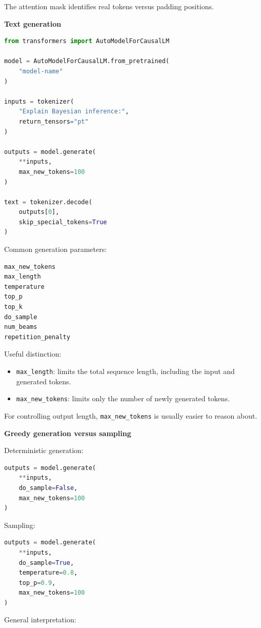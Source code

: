 \documentclass[11pt,letterpaper]{article}
\begin{document}
The attention mask identifies real tokens versus padding positions.

\textbf{Text generation}

\begin{lstlisting}[language=Python]
from transformers import AutoModelForCausalLM

model = AutoModelForCausalLM.from_pretrained(
    "model-name"
)

inputs = tokenizer(
    "Explain Bayesian inference:",
    return_tensors="pt"
)

outputs = model.generate(
    **inputs,
    max_new_tokens=100
)

text = tokenizer.decode(
    outputs[0],
    skip_special_tokens=True
)
\end{lstlisting}

Common generation parameters:

\begin{lstlisting}
max_new_tokens
max_length
temperature
top_p
top_k
do_sample
num_beams
repetition_penalty
\end{lstlisting}

Useful distinction:

\begin{itemize}[leftmargin=*]
    \item \texttt{max\_length}: limits the total sequence length, including the
    input and generated tokens.
    \item \texttt{max\_new\_tokens}: limits only the number of newly generated
    tokens.
\end{itemize}

For controlling output length, \texttt{max\_new\_tokens} is usually easier to
reason about.

\textbf{Greedy generation versus sampling}

Deterministic generation:

\begin{lstlisting}[language=Python]
outputs = model.generate(
    **inputs,
    do_sample=False,
    max_new_tokens=100
)
\end{lstlisting}

Sampling:

\begin{lstlisting}[language=Python]
outputs = model.generate(
    **inputs,
    do_sample=True,
    temperature=0.8,
    top_p=0.9,
    max_new_tokens=100
)
\end{lstlisting}

General interpretation:
\end{document}
